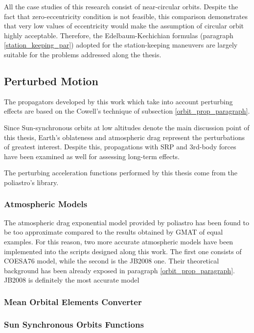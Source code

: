 All the case studies of this research consist of near-circular orbits.
Despite the fact that zero-eccentricity condition is not feasible, this comparison demonstrates that very low values of eccentricity would make the assumption of circular orbit highly acceptable.
Therefore, the Edelbaum-Kechichian formulas (paragraph \ref{station_keeping_par}) adopted for the station-keeping maneuvers are largely suitable for the problems addressed along the thesis.  


\subsection{Perturbed Motion}
The propagators developed by this work which take into account perturbing effects are based on the Cowell's technique of subsection \ref{orbit_prop_paragraph}.

Since Sun-synchronous orbits at low altitudes denote the main discussion point of this thesis, Earth's oblateness and atmospheric drag represent the perturbations of greatest interest. 
Despite this, propagations with SRP and 3rd-body forces have been examined as well for assessing long-term effects. 

The perturbing acceleration functions performed by this thesis come from the poliastro's library.


\subsubsection{Atmospheric Models}
The atmospheric drag exponential model provided by poliastro has been found to be too approximate compared to the results obtained by GMAT of equal examples.
For this reason, two more accurate atmospheric models have been implemented into the scripts designed along this work.
The first one consists of COESA76 model, while the second is the JB2008 one.
Their theoretical background has been already exposed in paragraph \ref{orbit_prop_paragraph}.
JB2008 is definitely the most accurate model


\subsubsection{Mean Orbital Elements Converter}


\subsubsection{Sun Synchronous Orbits Functions}


